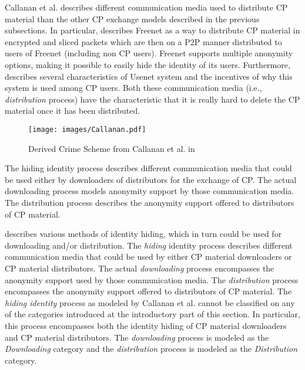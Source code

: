 \documentclass{sig-alternate-br}
\begin{document}
Callanan et al. \cite{callanan2009internet} describes different communication media used to distribute CP material than the other CP exchange models described in the previous subsections. In particular, \cite{callanan2009internet} describes Freenet \cite{site:freenet} as a way to distribute CP material in encrypted and sliced packets which are then on a P2P manner distributed to users of Freenet (including non CP users). Freenet supports multiple anonymity options, making it possible to easily hide the identity of its users. Furthermore, \cite{callanan2009internet} describes several characteristics of Usenet system and the incentives of why this system is used among CP users. Both these communication media (i.e., \textit{distribution} process) have the characteristic that it is really hard to delete the CP material once it has been distributed.

\begin{figure}[ht]
\centering
\texttt{[image: images/Callanan.pdf]}
\caption{Derived Crime Scheme from Callanan et al. in \cite{callanan2009internet}}
\label{fig:callanan_01}
\end{figure}

The hiding identity process describes different communication media that could be used either by downloaders of distributors for the exchange of CP. The actual downloading process models anonymity support by those communication media. The distribution process describes the anonymity support offered to distributors of CP material.

\cite{callanan2009internet} describes various methods of identity hiding, which in turn could be used for downloading and/or distribution. The \textit{hiding} identity process describes different communication media that could be used by either CP material downloaders or CP material distributors. The actual \textit{downloading} process encompasses the anonymity support used by those communication media. The \textit{distribution} process encompasses the anonymity support offered to distributors of CP material. The \textit{hiding identity} process as modeled by Callanan et al. cannot be classified on any of the categories introduced at the introductory part of this section. In particular, this process encompasses both the identity hiding of CP material downloaders and CP material distributors. The \textit{downloading} process is modeled as the \textit{Downloading} category and the \textit{distribution} process is modeled as the \textit{Distribution} category.
\end{document}

